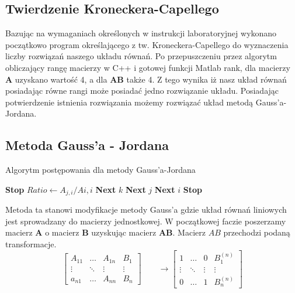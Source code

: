 \documentclass{article}
\begin{document}
\subsection{Twierdzenie Kroneckera-Capellego}
Bazując na wymaganiach określonych w instrukcji laboratoryjnej wykonano początkowo program określającego z tw. Kroneckera-Capellego do wyznaczenia liczby rozwiązań naszego układu równań.
Po przepuszczeniu przez algorytm obliczający rangę macierzy w C++ i gotowej funkcji Matlab rank, dla macierzy $\mathbf{A}$ uzyskano wartość 4, a dla $
\mathbf{AB}$ także 4. Z tego wynika iż nasz układ równań posiadając równe rangi może posiadać jedno rozwiązanie układu. Posiadając potwierdzenie istnienia rozwiązania możemy rozwiązać układ metodą Gauss'a-Jordana.\\
\subsection{Metoda Gauss'a - Jordana}
\begin{algorithm}[H]
    \caption{Algorytm postępowania dla metody Gauss'a-Jordana}\label{euclid}
    \begin{algorithmic}[1]
                \State \textbf{Stop}
            \EndIf
                    \State $Ratio \gets A_{j,i} / A{i,i}$
                    \State \textbf{Next} $k$
                    \EndFor
                \EndIf
            \State \textbf{Next} $j$
            \EndFor
        \State \textbf{Next} $i$
        \EndFor
        \State \textbf{Stop}
        \EndProcedure
    \end{algorithmic}
\end{algorithm}
Metoda ta stanowi modyfikacje metody Gauss'a gdzie układ  równań liniowych jest sprowadzany do macierzy jednostkowej. W początkowej faczie poszerzamy macierz $\mathbf{A}$ o macierz $\mathbf{B}$ uzyskując macierz $\mathbf{AB}$. Macierz $AB$ przechodzi podaną transformacje. \\
\[
\begin{bmatrix} 
    A_{11} & \dots & A_{1n} & B_{1} \\
    \vdots & \ddots & \vdots & \vdots \\
    a_{n1} &  \dots & A_{nn}     & B_{n} 
    \end{bmatrix}
\qquad
\rightarrow \begin{bmatrix} 
    1 & \dots & 0 & B_{1}^{(n)} \\
    \vdots & \ddots & \vdots & \vdots \\
    0 &  \dots & 1    & B_{n}^{(n)} 
    \end{bmatrix}
\]\\
\end{document}
